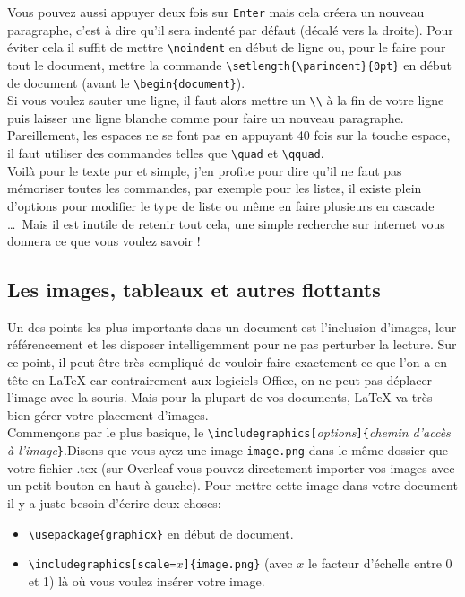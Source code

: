 \documentclass[11pt]{article}				%
\newcommand{\tb}{\textbackslash}
\newcommand{\cmdo}[3][]{\texttt{\textbackslash #2}\texttt{[#1}\texttt{]\{#3\}}}
\newcommand{\cmdoi}[3][]{\texttt{\textbackslash #2}\texttt{[}\textit{#1}\texttt{]\{}\textit{#3}\texttt{\}}}
\newcommand{\cmd}[2]{\texttt{\textbackslash #1}\texttt{\{#2\}}}
\begin{document}
Vous pouvez aussi appuyer deux fois sur \texttt{Enter} mais cela créera un nouveau paragraphe, c'est à dire qu'il sera indenté par défaut (décalé vers la droite). Pour éviter cela il suffit de mettre \texttt{\tb noindent} en début de ligne ou, pour le faire pour tout le document, mettre la commande \texttt{\tb setlength\{\tb parindent\}\{0pt\}} en début de document (avant le \texttt{\tb begin\{document\}}).\\
Si vous voulez sauter une ligne, il faut alors mettre un \texttt{\tb \tb} à la fin de votre ligne puis laisser une ligne blanche comme pour faire un nouveau paragraphe.\\
Pareillement, les espaces ne se font pas en appuyant 40 fois sur la touche espace, il faut utiliser des commandes telles que \texttt{\tb quad} et \texttt{\tb qquad}.\\

Voilà pour le texte pur et simple, j'en profite pour dire qu'il ne faut pas mémoriser toutes les commandes, par exemple pour les listes, il existe plein d'options pour modifier le type de liste ou même en faire plusieurs en cascade \dots \ Mais il est inutile de retenir tout cela, une simple recherche sur internet vous donnera ce que vous voulez savoir ! 

\subsection*{Les images, tableaux et autres flottants}

Un des points les plus importants dans un document est l'inclusion d'images, leur référencement et les disposer intelligemment pour ne pas perturber la lecture. Sur ce point, il peut être très compliqué de vouloir faire exactement ce que l'on a en tête en LaTeX car contrairement aux logiciels Office, on ne peut pas déplacer l'image avec la souris.
Mais pour la plupart de vos documents, LaTeX va très bien gérer votre placement d'images.\\

Commençons par le plus basique, le \cmdoi[options]{includegraphics}{\textit{chemin d'accès à l'image}}.Disons que vous ayez une image \texttt{image.png} dans le même dossier que votre fichier .tex (sur Overleaf vous pouvez directement importer vos images avec un petit bouton en haut à gauche). Pour mettre cette image dans votre document il y a juste besoin d'écrire deux choses: \\

\begin{itemize}
	\item \cmd{usepackage}{graphicx} en début de document.
	\item \cmdo[scale=$x$]{includegraphics}{image.png} \quad (avec $x$ le facteur d'échelle entre 0 et 1) là où vous voulez insérer votre image.
\end{itemize}
\end{document}
